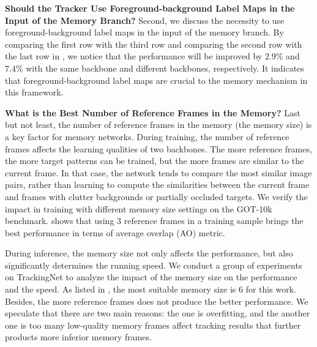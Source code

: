\documentclass[final]{cvpr}
\begin{document}
\textbf{Should the Tracker Use Foreground-background Label Maps in the Input of the Memory Branch?}
Second, we discuss the necessity to use foreground-background label maps in the input of the memory branch.
By comparing the first row with the third row and comparing the second row with the last row in , we notice that the performance will be improved by $2.9\%$ and $7.4\%$ with the same backbone and different backbones, respectively.
It indicates that foreground-background label maps are crucial to the memory mechanism in this framework.

\textbf{What is the Best Number of Reference Frames in the Memory?}
Last but not least, the number of reference frames in the memory (\ie the memory size) is a key factor for memory networks.
During training, the number of reference frames affects the learning qualities of two backbones.
The more reference frames, the more target patterns can be trained, but the more frames are similar to the current frame.
In that case, the network tends to compare the most similar image pairs, rather than learning to compute the similarities between the current frame and frames with clutter backgrounds or partially occluded targets.
We verify the impact in training with different memory size settings on the GOT-10k benchmark.
 shows that using 3 reference frames in a training sample brings the best performance in terms of average overlap (AO) metric.
\par
During inference, the memory size not only affects the performance, but also significantly determines the running speed.
We conduct a group of experiments on TrackingNet to analyze the impact of the memory size on the performance and the speed.
As listed in , the most suitable memory size is 6 for this work.
Besides, the more reference frames does not produce the better performance.
We speculate that there are two main reasons: the one is overfitting, and the another one is too many low-quality memory frames affect tracking results that further products more inferior memory frames.
\end{document}
